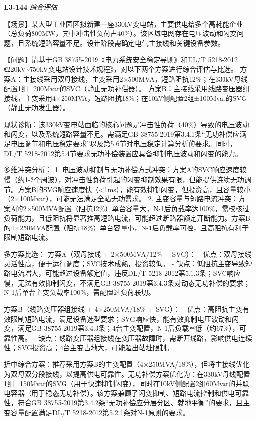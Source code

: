 \documentclass[12pt,a4paper]{ctexart}
\begin{document}
\noindent\textbf{L3-144} \hfill \textit{综合评估}
\begin{description}[leftmargin=1.5em,style=nextline,font=\normalfont]
  \item[Q:] 【场景】某大型工业园区拟新建一座330kV变电站，主要供电给多个高耗能企业（总负荷800MW，其中冲击性负荷占40\%）。该区域电网存在电压波动和闪变问题，且系统短路容量不足。设计阶段需确定电气主接线和关键设备参数。

【问题】请基于GB 38755-2019《电力系统安全稳定导则》和DL/T 5218-2012《220kV\textasciitilde{}750kV变电站设计技术规程》，对以下两个方案进行综合评估与比选。
方案A：主接线采用双母接线，主变采用2×500MVA，短路阻抗12\%；在330kV母线配置1组±200Mvar的SVC（静止无功补偿器）。
方案B：主接线采用线路变压器组接线，主变采用4×250MVA，短路阻抗18\%；在10kV侧配置2组±100Mvar的SVG（静止无功发生器）。
  \item[A:] 现状诊断：该330kV变电站面临的核心问题是冲击性负荷（40\%）导致的电压波动和闪变，以及系统短路容量不足。需满足GB 38755-2019第3.4.1条“无功补偿应满足电压调节和电压稳定要求”以及第5.6节对电压稳定计算分析的要求。同时，DL/T 5218-2012第5.4节要求无功补偿装置应具备抑制电压波动和闪变的能力。

多维冲突分析：
1. 电压波动抑制与无功补偿方式冲突：方案A的SVC响应速度较慢（约1-2个周波），对冲击性负荷引起的闪变抑制效果有限，但能提供连续无功调节。方案B的SVG响应速度快（\textless{}1ms），能有效抑制闪变，但投资高，且容量较小（2×100Mvar），可能无法满足全站无功需求。
2. 主变容量与短路电流冲突：方案A的2×500MVA配置（阻抗12\%）单台容量大，N-1后负载率达100\%，需校核过负荷能力，且低阻抗将显著推高短路电流，可能超过断路器额定开断能力。方案B的4×250MVA配置（阻抗18\%）单台容量小，N-1后负载率可控，且高阻抗有利于限制短路电流。

多方案比选：
方案A（双母接线 + 2×500MVA/12\% + SVC）：
- 优点：双母接线灵活性高，便于运行调度；SVC技术成熟，投资较低。
- 缺点：低阻抗主变导致短路电流增大，可能超过设备额定值，违反DL/T 5218-2012第5.1.3条；SVC响应慢，无法有效抑制闪变，不满足GB 38755-2019第3.4.3条对动态无功补偿的要求；N-1后单台主变负载率100\%，需配置过负荷联切。

方案B（线路变压器组接线 + 4×250MVA/18\% + SVG）：
- 优点：高阻抗主变有效限制短路电流，满足设备选型要求；SVG响应快，能有效抑制电压波动和闪变，满足GB 38755-2019第3.4.3条；4台主变配置，N-1后负载率低（约67\%），可靠性高。
- 缺点：线路变压器组接线在变压器故障时，需断开线路，影响供电连续性；SVG投资高；4台主变占地大，可能超出站址限制。

折中综合方案：推荐采用方案B的主变配置（4×250MVA/18\%），但将主接线优化为双母双分段接线，以提高供电可靠性。无功补偿方案优化为：在330kV母线配置1组±150Mvar的SVG（用于快速抑制闪变），同时在10kV侧配置2组60Mvar的并联电容器（用于稳态无功补偿）。该方案兼顾了闪变抑制、短路电流控制和供电可靠性，符合GB 38755-2019第3.4.2条“无功补偿应分层分区、就地平衡”的要求，且主变容量配置满足DL/T 5218-2012第5.2.1条对N-1原则的要求。


\end{description}
\end{document}
